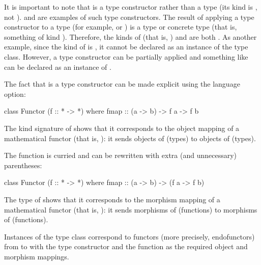 It is important to note that  is a type constructor
rather than a type (its kind is \texthaskell{* -> *}, not
\texthaskell{*}). \texthaskell{[]} and  are
examples of such type constructors. The result of applying a type
constructor to a type (for example,  or
) is a type or concrete type (that is, something of
kind \texthaskell{*}). Therefore, the kinds of 
(that is, \texthaskell{[Int]}) and  are both
\texthaskell{*}. As another example, since the kind of
 is \texthaskell{* -> * -> *}, it cannot be
declared as an instance of the  type class.
However, a type constructor can be partially applied and something
like  can be declared as an instance of
.

The fact that  is a type constructor can be made
explicit using the  language option:
\begin{codehaskell}
class Functor (f :: * -> *) where
  fmap :: (a -> b) -> f a -> f b
\end{codehaskell}
The kind signature of  shows that it corresponds to the
object mapping of a mathematical functor (that is, ): it
sends objects of \hask (types) to objects of \hask (types).

The  function is curried and can be rewritten with
extra (and unnecessary) parentheses:
\begin{codehaskell}
class Functor (f :: * -> *) where
  fmap :: (a -> b) -> (f a -> f b)
\end{codehaskell}
The type of  shows that it corresponds to the
morphism mapping of a mathematical functor (that is, ): it
sends morphisms of \hask (functions) to morphisms of \hask
(functions).

Instances of the  type class correspond to
functors (more precisely, endofunctors) from \hask to \hask with the
type constructor and the  function as the required
object and morphism mappings.

